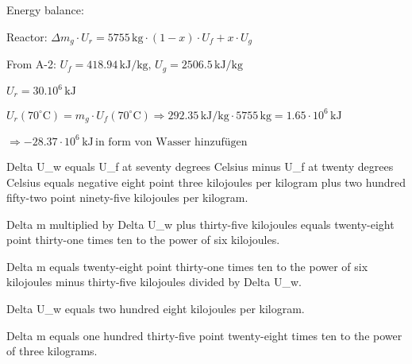Energy balance:  

Reactor:  
\( \Delta m_{g} \cdot U_{r} = 5755 \, \text{kg} \cdot (1 - x) \cdot U_{f} + x \cdot U_{g} \)  

From A-2:  
\( U_{f} = 418.94 \, \text{kJ/kg}, \, U_{g} = 2506.5 \, \text{kJ/kg} \)  

\( U_{r} = 30.10^{6} \, \text{kJ} \)  

\( U_{r}(70^\circ \text{C}) = m_{g} \cdot U_{f}(70^\circ \text{C}) \Rightarrow 292.35 \, \text{kJ/kg} \cdot 5755 \, \text{kg} = 1.65 \cdot 10^{6} \, \text{kJ} \)  

\( \Rightarrow -28.37 \cdot 10^{6} \, \text{kJ} \, \text{in form von Wasser hinzufügen} \)

Delta U_w equals U_f at seventy degrees Celsius minus U_f at twenty degrees Celsius equals negative eight point three kilojoules per kilogram plus two hundred fifty-two point ninety-five kilojoules per kilogram.  

Delta m multiplied by Delta U_w plus thirty-five kilojoules equals twenty-eight point thirty-one times ten to the power of six kilojoules.  

Delta m equals twenty-eight point thirty-one times ten to the power of six kilojoules minus thirty-five kilojoules divided by Delta U_w.  

Delta U_w equals two hundred eight kilojoules per kilogram.  

Delta m equals one hundred thirty-five point twenty-eight times ten to the power of three kilograms.